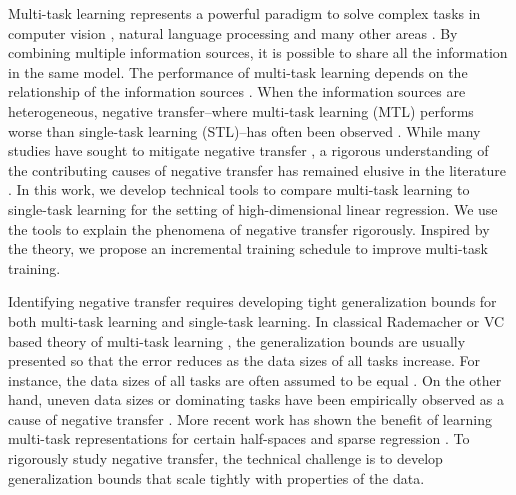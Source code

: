 Multi-task learning represents a powerful paradigm to solve complex tasks in computer vision \cite{chexnet17,ZSSGM18}, natural language processing \cite{GLUE,superglue} and many other areas \cite{ZY17}.
By combining multiple information sources, it is possible to share all the information in the same model.
The performance of multi-task learning depends on the relationship of the information sources \cite{C97}.
When the information sources are heterogeneous, negative transfer--where multi-task learning (MTL)  performs worse than single-task learning (STL)--has often been observed \cite{AP16,BS17}.
While many studies have sought to mitigate negative transfer \cite{ZY17}, a rigorous understanding of the contributing causes of negative transfer has remained elusive in the literature \cite{R17}.
In this work, we develop technical tools to compare multi-task learning to single-task learning for the setting of high-dimensional linear regression. %
We use the tools to explain the phenomena of negative transfer rigorously.
Inspired by the theory, we propose an incremental training schedule to improve multi-task training.

Identifying negative transfer requires developing tight generalization bounds for both multi-task learning and single-task learning.
In classical Rademacher or VC based theory of multi-task learning \cite{B00,AZ05,M06}, the generalization bounds are usually presented so that the error reduces as the data sizes of all tasks increase.
For instance, the data sizes of all tasks are often assumed to be equal \cite{B00}.
On the other hand, uneven data sizes or dominating tasks have been empirically observed as a cause of negative transfer \cite{YKGLHF20}.
More recent work has shown the benefit of learning multi-task representations for certain half-spaces \cite{MPR16} and sparse regression \cite{LPTV09,LPVT11}.
To rigorously study negative transfer, the technical challenge is to develop generalization bounds that scale tightly with properties of the data.


